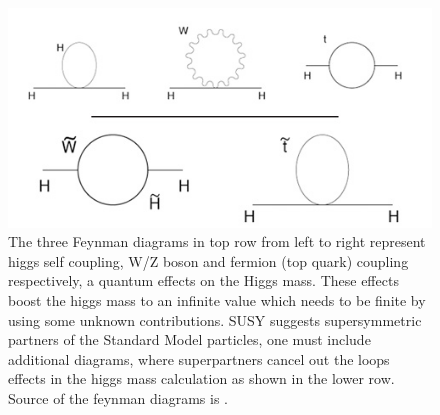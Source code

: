 \begin{figure}[htp]
\centering
\hspace{-0.3cm}
\includegraphics[scale=0.65]{fig/chapt2/higgs_mass_loop.jpg}
\caption{\label{fig:higgs_massloop}The three Feynman diagrams in top row from left to right represent higgs self coupling, W/Z boson and fermion (top quark) coupling respectively, a quantum effects on the Higgs mass. These effects boost the higgs mass to an infinite value which needs to be finite by using some unknown contributions. SUSY suggests supersymmetric partners of the Standard Model particles, one must include additional diagrams, where superpartners cancel out the loops effects in the higgs mass calculation as shown in the lower row. Source of the feynman diagrams is \cite{pub:higgsmassloop}.}
\end{figure}

